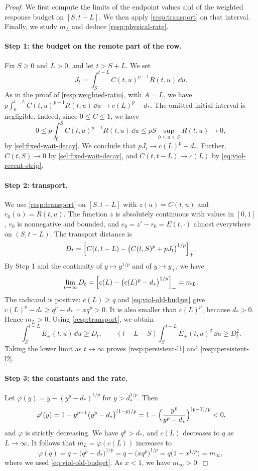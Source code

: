 \begin{proof}
We first compute the limits of the endpoint values and of the weighted response budget on $[S,t-L]$. We then apply \cref{resp:transport} on that interval. Finally, we study $m_L$ and deduce \eqref{resp:physical-rate}.

\paragraph{Step 1: the budget on the remote part of the row.}
Fix $S\ge0$ and $L>0$, and let $t>S+L$. We set
\[
 J_t=\int_S^{t-L}C(t,u)^{p-1}R(t,u)\,\dd u.
\]
As in the proof of \cref{resp:weighted-ratio}, with $A=L$, we have $p\int_0^{t-L}C(t,u)^{p-1}R(t,u)\,\dd u\to c(L)^p-d_*$. The omitted initial interval is negligible. Indeed, since $0\le C\le1$, we have
\[
 0\le p\int_0^SC(t,u)^{p-1}R(t,u)\,\dd u\le pS\sup_{0\le u\le S}R(t,u)\longrightarrow0,
\]
by \eqref{sel:fixed-wait-decay}. We conclude that $pJ_t\to c(L)^p-d_*$. Further, $C(t,S)\to0$ by \eqref{sel:fixed-wait-decay}, and $C(t,t-L)\to c(L)$ by \eqref{eq:viol-recent-strip}.

\paragraph{Step 2: transport.}
We use \cref{resp:transport} on $[S,t-L]$ with $z(u)=C(t,u)$ and $r_0(u)=R(t,u)$. The function $z$ is absolutely continuous with values in $[0,1]$, $r_0$ is nonnegative and bounded, and $e_0=z'-r_0=E(t,\cdot)$ almost everywhere on $(S,t-L)$. The transport distance is
\[
 D_t=\Bigl[C(t,t-L)-\bigl(C(t,S)^p+pJ_t\bigr)^{1/p}\Bigr]_+.
\]
By Step 1 and the continuity of $y\mapsto y^{1/p}$ and of $y\mapsto y_+$, we have
\[
 \lim_{t\to\infty}D_t=\Bigl[c(L)-\bigl(c(L)^p-d_*\bigr)^{1/p}\Bigr]_+=m_L.
\]
The radicand is positive: $c(L)\ge q$ and \eqref{eq:viol-old-budget} give $c(L)^p-d_*\ge q^p-d_*=xq^p>0$. It is also smaller than $c(L)^p$, because $d_*>0$. Hence $m_L>0$. Using \cref{resp:transport}, we obtain
\[
 \int_S^{t-L}E_+(t,u)\,\dd u\ge D_t,
 \qquad
 (t-L-S)\int_S^{t-L}E_+(t,u)^2\,\dd u\ge D_t^2.
\]
Taking the lower limit as $t\to\infty$ proves \eqref{resp:persistent-l1} and \eqref{resp:persistent-l2}.

\paragraph{Step 3: the constants and the rate.}
Let $\varphi(y)=y-(y^p-d_*)^{1/p}$ for $y>d_*^{1/p}$. Then
\[
 \varphi'(y)=1-y^{p-1}\bigl(y^p-d_*\bigr)^{(1-p)/p}
 =1-\Bigl(\frac{y^p}{y^p-d_*}\Bigr)^{(p-1)/p}<0,
\]
and $\varphi$ is strictly decreasing. We have $q^p>d_*$, and $c(L)$ decreases to $q$ as $L\to\infty$. It follows that $m_L=\varphi(c(L))$ increases to
\[
 \varphi(q)=q-\bigl(q^p-d_*\bigr)^{1/p}=q-\bigl(xq^p\bigr)^{1/p}=q\bigl(1-x^{1/p}\bigr)=m_\infty,
\]
where we used \eqref{eq:viol-old-budget}. As $x<1$, we have $m_\infty>0$.


\end{proof}

